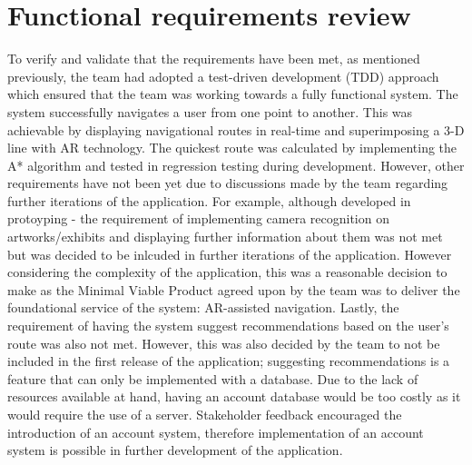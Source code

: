 \section{Functional requirements review}
To verify and validate that the requirements have been met, as mentioned previously, the team had adopted a test-driven development (TDD) approach which ensured that the team was working towards a fully functional system. The system successfully navigates a user from one point to another. This was achievable by displaying navigational routes in real-time and superimposing a 3-D line with AR technology. The quickest route was calculated by implementing the A* algorithm and tested in regression testing during development. However, other requirements have not been yet due to discussions made by the team regarding further iterations of the application. For example, although developed in protoyping - the requirement of implementing camera recognition on artworks/exhibits and displaying further information about them was not met but was decided to be inlcuded in further iterations of the application. However considering the complexity of the application, this was a reasonable decision to make as the Minimal Viable Product agreed upon by the team was to deliver the foundational service of the system: AR-assisted navigation. Lastly, the requirement of having the system suggest recommendations based on the user's route was also not met. However, this was also decided by the team to not be included in the first release of the application; suggesting recommendations is a feature that can only be implemented with a database. Due to the lack of resources available at hand, having an account database would be too costly as it would require the use of a server. Stakeholder feedback encouraged the introduction of an account system, therefore implementation of an account system is possible in further development of the application.


